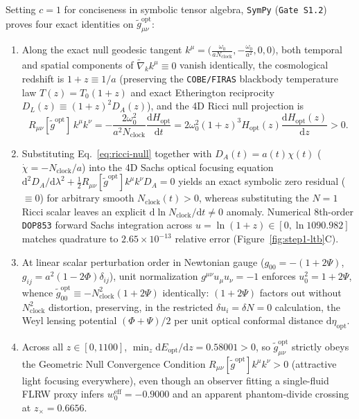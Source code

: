 \documentclass[11pt,a4paper]{article}
\begin{document}
Setting $c = 1$ for conciseness in symbolic tensor algebra, \texttt{SymPy} (\texttt{Gate S1.2}) proves four exact identities on $\tilde{g}_{\mu\nu}^{\mathrm{opt}}$:
\begin{enumerate}
    \item Along the exact null geodesic tangent $k^\mu = \bigl(\frac{\omega_0}{a N_{\mathrm{clock}}}, -\frac{\omega_0}{a^2}, 0, 0\bigr)$, both temporal and spatial components of $\tilde{\nabla}_k k^\mu \equiv 0$ vanish identically, the cosmological redshift is $1 + z \equiv 1/a$ (preserving the \texttt{COBE/FIRAS} blackbody temperature law $T(z) = T_0(1+z)$ and exact Etherington reciprocity $D_L(z) \equiv (1+z)^2 D_A(z)$), and the 4D Ricci null projection is
    \begin{equation}
        R_{\mu\nu}[\tilde{g}^{\mathrm{opt}}]\,k^\mu k^\nu = -\frac{2\omega_0^2}{a^2 N_{\mathrm{clock}}}\frac{\mathrm{d}H_{\mathrm{opt}}}{\mathrm{d}t} = 2\omega_0^2(1+z)^3 H_{\mathrm{opt}}(z)\frac{\mathrm{d}H_{\mathrm{opt}}(z)}{\mathrm{d}z} > 0.
        \label{eq:ricci-null}
    \end{equation}
    \item Substituting Eq.~\eqref{eq:ricci-null} together with $D_A(t) = a(t)\chi(t)$ ($\dot{\chi} = -N_{\mathrm{clock}}/a$) into the 4D Sachs optical focusing equation $\mathrm{d}^2 D_A/\mathrm{d}\lambda^2 + \frac{1}{2}R_{\mu\nu}[\tilde{g}^{\mathrm{opt}}]k^\mu k^\nu D_A = 0$ yields an exact symbolic zero residual ($\equiv 0$) for arbitrary smooth $N_{\mathrm{clock}}(t) > 0$, whereas substituting the $N = 1$ Ricci scalar leaves an explicit $\mathrm{d}\ln N_{\mathrm{clock}}/\mathrm{d}t \neq 0$ anomaly. Numerical 8th-order \texttt{DOP853} forward Sachs integration across $u = \ln(1+z) \in [0, \ln 1090.982]$ matches quadrature to $2.65\times 10^{-13}$ relative error (Figure~\ref{fig:step1-ltb}C).
    \item At linear scalar perturbation order in Newtonian gauge ($g_{00} = -(1 + 2\Psi)$, $g_{ij} = a^2(1 - 2\Phi)\delta_{ij}$), unit normalization $g^{\mu\nu}u_\mu u_\nu = -1$ enforces $u_0^2 = 1 + 2\Psi$, whence $\tilde{g}_{00}^{\mathrm{opt}} \equiv -N_{\mathrm{clock}}^2(1 + 2\Psi)$ identically: $(1 + 2\Psi)$ factors out without $N_{\mathrm{clock}}^2$ distortion, preserving, in the restricted $\delta u_i=\delta N=0$ calculation, the Weyl lensing potential $(\Phi + \Psi)/2$ per unit optical conformal distance $\mathrm{d}\eta_{\mathrm{opt}}$.
    \item Across all $z \in [0, 1100]$, $\min_z \mathrm{d}E_{\mathrm{opt}}/\mathrm{d}z = 0.58001 > 0$, so $\tilde{g}_{\mu\nu}^{\mathrm{opt}}$ strictly obeys the Geometric Null Convergence Condition $R_{\mu\nu}[\tilde{g}^{\mathrm{opt}}]k^\mu k^\nu > 0$ (attractive light focusing everywhere), even though an observer fitting a single-fluid FLRW proxy infers $w_0^{\mathrm{eff}} = -0.9000$ and an apparent phantom-divide crossing at $z_\times = 0.6656$.
\end{enumerate}
\end{document}
